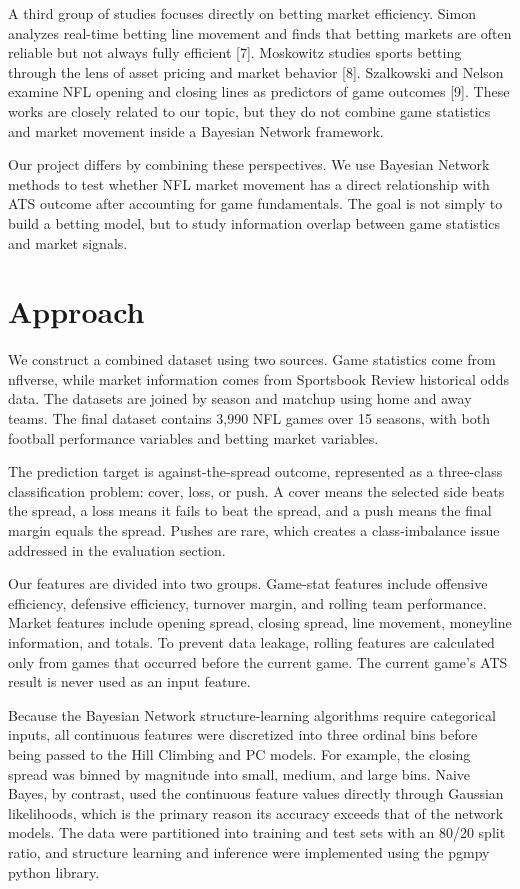 \documentclass[letterpaper]{article}
\begin{document}
A third group of studies focuses directly on betting market efficiency. Simon analyzes real-time betting line movement and finds that betting markets are often reliable but not always fully efficient [7]. Moskowitz studies sports betting through the lens of asset pricing and market behavior [8]. Szalkowski and Nelson examine NFL opening and closing lines as predictors of game outcomes [9]. These works are closely related to our topic, but they do not combine game statistics and market movement inside a Bayesian Network framework. 

Our project differs by combining these perspectives. We use Bayesian Network methods to test whether NFL market movement has a direct relationship with ATS outcome after accounting for game fundamentals. The goal is not simply to build a betting model, but to study information overlap between game statistics and market signals. 

\section{Approach}

We construct a combined dataset using two sources. Game statistics come from nflverse, while market information comes from Sportsbook Review historical odds data. The datasets are joined by season and matchup using home and away teams. The final dataset contains 3,990 NFL games over 15 seasons, with both football performance variables and betting market variables. 

The prediction target is against-the-spread outcome, represented as a three-class classification problem: cover, loss, or push. A cover means the selected side beats the spread, a loss means it fails to beat the spread, and a push means the final margin equals the spread. Pushes are rare, which creates a class-imbalance issue addressed in the evaluation section. 

Our features are divided into two groups. Game-stat features include offensive efficiency, defensive efficiency, turnover margin, and rolling team performance. Market features include opening spread, closing spread, line movement, moneyline information, and totals. To prevent data leakage, rolling features are calculated only from games that occurred before the current game. The current game’s ATS result is never used as an input feature. 

Because the Bayesian Network structure-learning algorithms require categorical inputs, all continuous features were discretized into three ordinal bins before being passed to the Hill Climbing and PC models. For example, the closing spread was binned by magnitude into small, medium, and large bins. Naive Bayes, by contrast, used the continuous feature values directly through Gaussian likelihoods, which is the primary reason its accuracy exceeds that of the network models. The data were partitioned into training and test sets with an 80/20 split ratio, and structure learning and inference were implemented using the pgmpy python library. 
\end{document}
